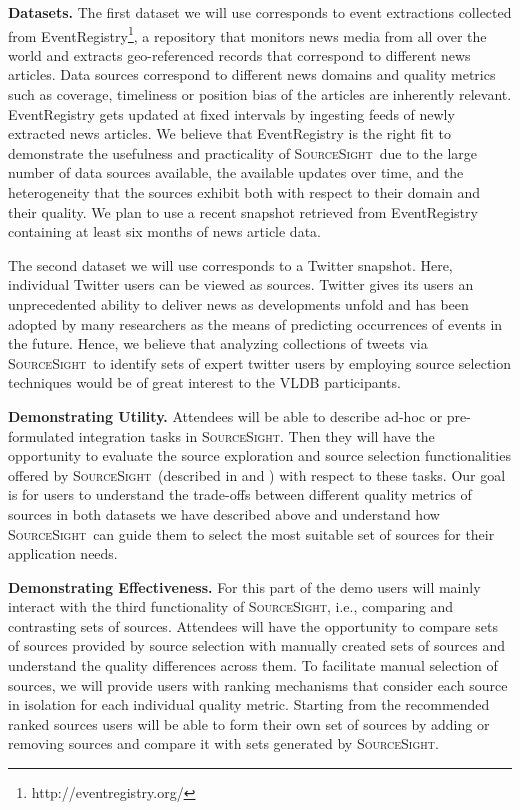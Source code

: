 \documentclass{vldb}
\newcommand\system{\textsc{SourceSight}}
\begin{document}
\vspace{2pt}\noindent\textbf{Datasets.} The first dataset we will use corresponds to event extractions collected from EventRegistry\footnote{http://eventregistry.org/}, a repository that monitors news media from all over the world and extracts geo-referenced records that correspond to different news articles. Data sources correspond to different news domains and quality metrics such as coverage, timeliness or position bias of the articles are inherently relevant. EventRegistry gets updated at fixed intervals  by ingesting feeds of newly extracted news articles. We believe that EventRegistry is the right fit to demonstrate the usefulness and practicality of \system~due to the large number of data sources available, the available updates over time, and the heterogeneity that the sources exhibit both with respect to their domain and their quality. We plan to use a recent snapshot retrieved from EventRegistry containing at least six months of news article data. 

The second dataset we will use corresponds to a Twitter snapshot. Here, individual Twitter users can be viewed as sources. Twitter gives its users an unprecedented ability to deliver news as developments unfold and has been adopted by many researchers as the means of predicting occurrences of events in the future. Hence, we believe that analyzing collections of tweets via \system~to identify sets of expert twitter users by employing source selection techniques would be of great interest to the VLDB participants.

\vspace{2pt}\noindent\textbf{Demonstrating Utility.} Attendees will be able to describe ad-hoc or pre-formulated integration tasks in \system. Then they will have the opportunity to evaluate the source exploration and source selection functionalities offered by \system~(described in  and ) with respect to these tasks. Our goal is for users to understand the trade-offs between different quality metrics of sources in both datasets we have described above and understand how \system~can guide them to select the most suitable set of sources for their application needs.

\vspace{2pt}\noindent\textbf{Demonstrating Effectiveness.} For this part of the demo users will mainly interact with the third functionality of \system, i.e., comparing and contrasting sets of sources. Attendees will have the opportunity to compare sets of sources provided by source selection with manually created sets of sources and understand the quality differences across them. To facilitate manual selection of sources, we will provide users with ranking mechanisms that consider each source in isolation for each individual quality metric. Starting from the recommended ranked sources users will be able to form their own set of sources by adding or removing sources and compare it with sets generated by \system. 
\end{document}
